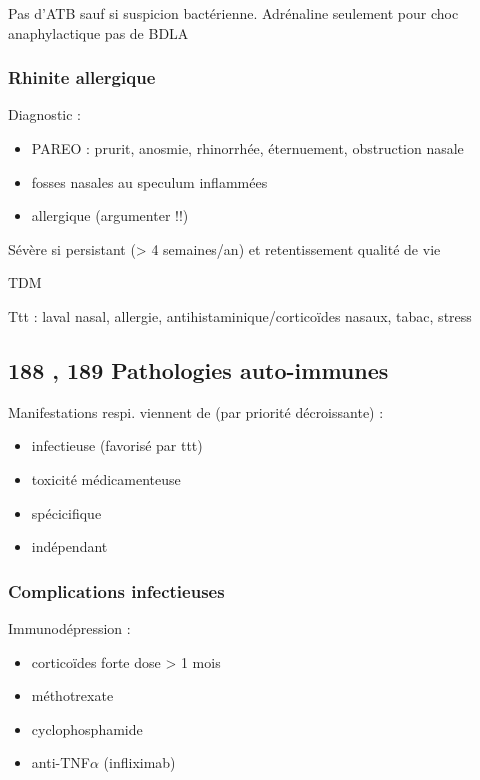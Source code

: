 \documentclass[11pt]{article}
\begin{document}
Pas d'ATB sauf si suspicion bactérienne. Adrénaline seulement pour choc anaphylactique
\danger pas de BDLA 

\subsubsection{Rhinite allergique}
\label{sec:orgead8341}
Diagnostic :

\begin{itemize}
\item PAREO : prurit, anosmie, rhinorrhée, éternuement, obstruction nasale
\item fosses nasales au speculum inflammées
\item allergique (argumenter !!)
\end{itemize}

Sévère si persistant (> 4 semaines/an) et retentissement qualité de vie

TDM

Ttt : laval nasal, allergie, antihistaminique/corticoïdes nasaux, tabac, stress

\subsection{188 \textdagger{}, 189 Pathologies auto-immunes}
\label{sec:org3e8a639}
\label{sec:pathologies_auto_immunes}

Manifestations respi. viennent de (par priorité décroissante) :

\begin{itemize}
\item infectieuse (favorisé par ttt)
\item toxicité médicamenteuse
\item spécicifique
\item indépendant
\end{itemize}


\subsubsection{Complications infectieuses}
\label{sec:org334a16a}
Immunodépression :

\begin{itemize}
\item corticoïdes forte dose > 1 mois
\item méthotrexate
\item cyclophosphamide
\item anti-TNF\(\alpha\) (infliximab)
\end{itemize}
\end{document}
